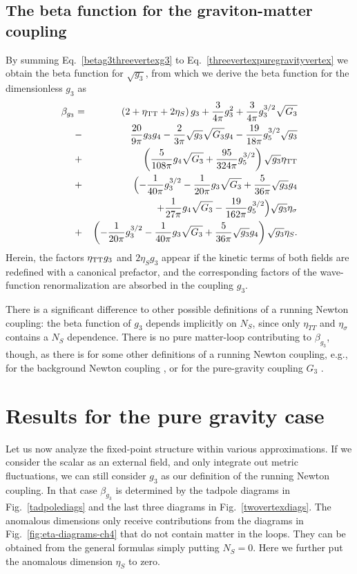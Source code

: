 \documentclass[11pt]{book} %
\newcommand{\bea}{\begin{eqnarray}}
\newcommand{\eea}{\end{eqnarray}}
\numberwithin{equation}{chapter}
\begin{document}
\subsection{The beta function for the graviton-matter coupling}
By summing Eq.~\eqref{betag3threevertexg3} to Eq.~\eqref{threevertexpuregravityvertex} we
obtain the beta function for $\sqrt{g_3}$,
from which we derive the beta function for the dimensionless $g_3$ as
%
\bea
\beta_{g_3}& =&
\left(2+\eta_{\rm TT}+2\eta_S\right)g_3
+\frac{3}{4\pi}g_3^2
+ \frac{3}{4\pi}g_3^{3/2}\sqrt{G_3}
\nonumber\\
&-&\!\frac{20}{9\pi}g_3 g_4
- \frac{2}{3 \pi} \sqrt{g_3}\sqrt{G_3}g_4
- \frac{19}{18 \pi} g_5^{3/2}\sqrt{g_3}
\nonumber\\
&+& \!\left(\frac{5}{108\pi}g_4 \sqrt{G_3}
+ \frac{95}{324\pi} g_5^{3/2}\right)\sqrt{g_3}\eta_{\rm TT}
\nonumber\\
&+&\! \!\Bigl(-\frac{1}{40 \pi}g_3^{3/2}
- \frac{1}{20 \pi} g_3 \sqrt{G_3}
+ \frac{5}{36 \pi} \sqrt{g_3} g_4
\nonumber\\
&{}&+ \frac{1}{27 \pi}g_4 \sqrt{G_3}
- \frac{19}{162\pi}g_5^{3/2}\Bigr)\sqrt{g_3}\eta_{\sigma}
\\
&+& \!\left(- \frac{1}{20 \pi}g_3^{3/2}
- \frac{1}{40 \pi} g_3 \sqrt{G_3}
+ \frac{5}{36 \pi}\sqrt{g_3} g_4 \right)\sqrt{g_3}\eta_S.
\nonumber%
\eea
%
Herein, the factors $\eta_{\rm TT} g_3$ and $2 \eta_S g_3$ appear if the kinetic terms of both
fields are redefined with a canonical prefactor,
and the corresponding factors of the wave-function renormalization are absorbed in the coupling $g_3$.

 There is a significant difference to other possible definitions of a running Newton coupling:
 the beta function of $g_3$ depends implicitly on $N_S$,
 since only $\eta_{TT}$ and $\eta_{\sigma}$ contains a $N_S$ dependence.
There is no pure matter-loop contributing to $\beta_{g_3}$, though,
as there is for some other definitions of a running Newton coupling, e.g.,
for the background Newton coupling \cite{Dona:2013qba},
or for the pure-gravity coupling $G_3$ \cite{Meibohm:2015twa}.


\section{Results for the pure gravity case}
Let us now analyze the fixed-point structure within various approximations.
If we consider the scalar as an external field, and only integrate out metric fluctuations,
we can still consider $g_3$ as our definition of the running Newton coupling.
In that case $\beta_{g_3}$ is determined by the tadpole diagrams in
Fig.~\ref{tadpolediags} and the last three diagrams in Fig.~\ref{twovertexdiags}.
The anomalous dimensions only receive contributions from the diagrams in Fig.~\ref{fig:eta-diagrams-ch4}
that do not contain matter in the loops.
They can be obtained from the general formulas simply putting $N_S=0$.
Here we further put the anomalous dimension $\eta_S$ to zero.
\end{document}
